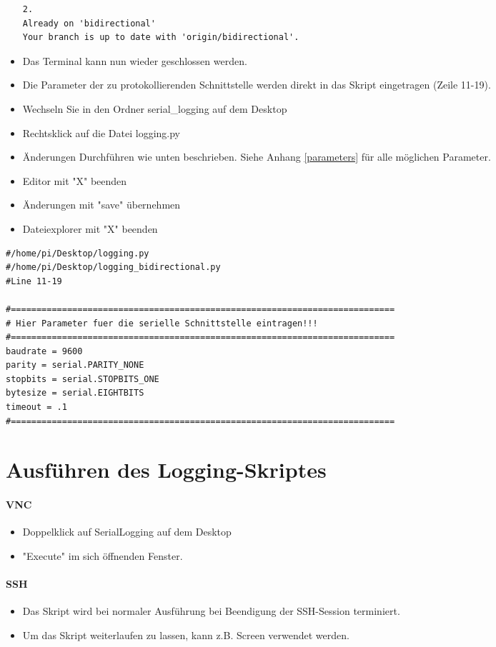 \documentclass{article}
\begin{document}
\begin{itemize}
\begin{lstlisting}
2.
Already on 'bidirectional'
Your branch is up to date with 'origin/bidirectional'.
\end{lstlisting}
	\item Das Terminal kann nun wieder geschlossen werden.
	\item Die Parameter der zu protokollierenden Schnittstelle werden direkt in das Skript eingetragen (Zeile 11-19).
	\item Wechseln Sie in den Ordner serial\_logging auf dem Desktop
	\item Rechtsklick auf die Datei logging.py
	\item Änderungen Durchführen wie unten beschrieben. Siehe Anhang \ref{parameters} für alle möglichen Parameter.
	\item Editor mit "X" beenden
	\item Änderungen mit "save" übernehmen
	\item Dateiexplorer mit "X" beenden
\end{itemize}

\begin{lstlisting}
#/home/pi/Desktop/logging.py
#/home/pi/Desktop/logging_bidirectional.py
#Line 11-19

#=========================================================================== 
# Hier Parameter fuer die serielle Schnittstelle eintragen!!!
#=========================================================================== 
baudrate = 9600
parity = serial.PARITY_NONE
stopbits = serial.STOPBITS_ONE
bytesize = serial.EIGHTBITS
timeout = .1
#=========================================================================== 
\end{lstlisting}


\section{Ausführen des Logging-Skriptes}
\paragraph{VNC}
\begin{itemize}
	\item Doppelklick auf SerialLogging auf dem Desktop
	\item "Execute" im sich öffnenden Fenster.
\end{itemize}

\paragraph{SSH}
\begin{itemize}
	\item Das Skript wird bei normaler Ausführung bei Beendigung der SSH-Session terminiert.
	\item Um das Skript weiterlaufen zu lassen, kann z.B. Screen verwendet werden.
\end{itemize}
\end{document}
